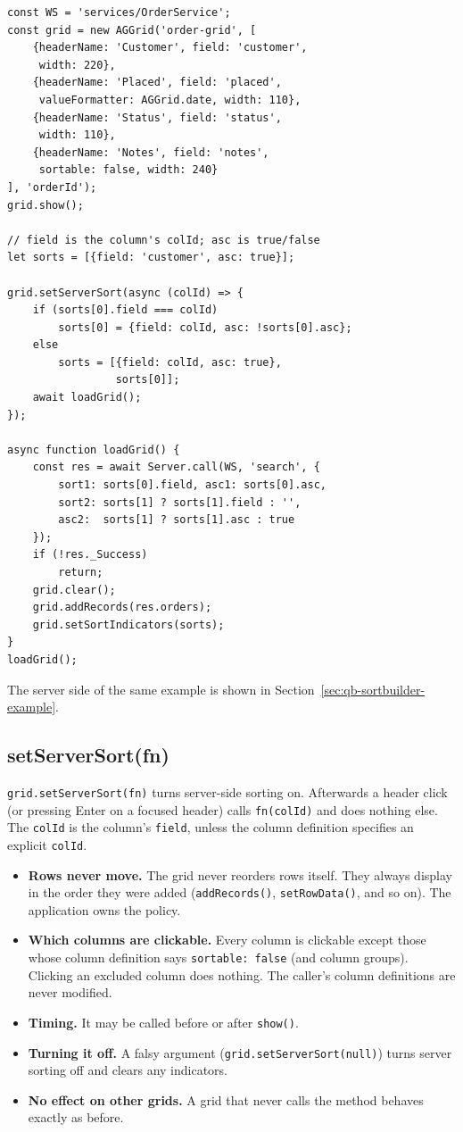\begin{lstlisting}[style=javascript]
const WS = 'services/OrderService';
const grid = new AGGrid('order-grid', [
    {headerName: 'Customer', field: 'customer',
     width: 220},
    {headerName: 'Placed', field: 'placed',
     valueFormatter: AGGrid.date, width: 110},
    {headerName: 'Status', field: 'status',
     width: 110},
    {headerName: 'Notes', field: 'notes',
     sortable: false, width: 240}
], 'orderId');
grid.show();

// field is the column's colId; asc is true/false
let sorts = [{field: 'customer', asc: true}];

grid.setServerSort(async (colId) => {
    if (sorts[0].field === colId)
        sorts[0] = {field: colId, asc: !sorts[0].asc};
    else
        sorts = [{field: colId, asc: true},
                 sorts[0]];
    await loadGrid();
});

async function loadGrid() {
    const res = await Server.call(WS, 'search', {
        sort1: sorts[0].field, asc1: sorts[0].asc,
        sort2: sorts[1] ? sorts[1].field : '',
        asc2:  sorts[1] ? sorts[1].asc : true
    });
    if (!res._Success)
        return;
    grid.clear();
    grid.addRecords(res.orders);
    grid.setSortIndicators(sorts);
}
loadGrid();
\end{lstlisting}

\noindent
The server side of the same example is shown in Section~\ref{sec:qb-sortbuilder-example}.

\subsection{setServerSort(fn)}

\texttt{grid.setServerSort(fn)} turns server-side sorting on.  Afterwards a header click (or pressing Enter on a focused header) calls \texttt{fn(colId)} and does nothing else.  The \texttt{colId} is the column's \texttt{field}, unless the column definition specifies an explicit \texttt{colId}.

\begin{itemize}
  \item \textbf{Rows never move.}  The grid never reorders rows itself.  They always display in the order they were added (\texttt{addRecords()}, \texttt{setRowData()}, and so on).  The application owns the policy.
  \item \textbf{Which columns are clickable.}  Every column is clickable except those whose column definition says \texttt{sortable: false} (and column groups).  Clicking an excluded column does nothing.  The caller's column definitions are never modified.
  \item \textbf{Timing.}  It may be called before or after \texttt{show()}.
  \item \textbf{Turning it off.}  A falsy argument (\texttt{grid.setServerSort(null)}) turns server sorting off and clears any indicators.
  \item \textbf{No effect on other grids.}  A grid that never calls the method behaves exactly as before.
\end{itemize}


